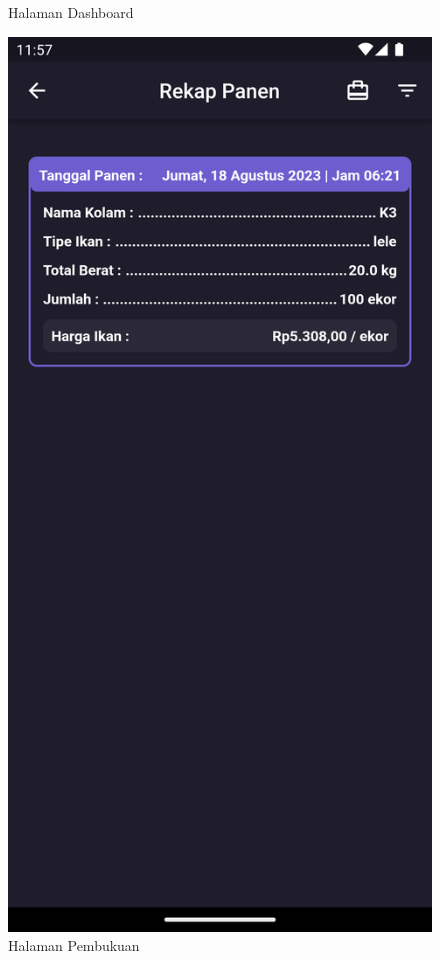 \begin{spacing}{1.5}
\begin{enumerate}
\begin{enumerate}
\begin{itemize}
\begin{figure}[H]
						\caption{Halaman Dashboard}
					\endminipage\hfill
						\includegraphics[width=\linewidth]{gambar/sprint5/pembukuan.png}
						\caption{Halaman Pembukuan}
					\endminipage\hfill
				\end{figure}


\end{itemize}
\end{enumerate}
\end{enumerate}
\end{spacing}
